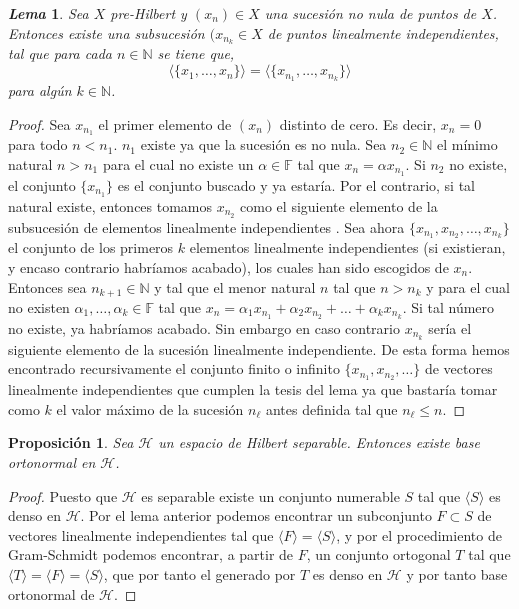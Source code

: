 \documentclass[12pt]{book}
\newtheorem{prop}{\bf Proposición}[chapter]
\newtheorem{lema}{\it Lema}[chapter]
\def\NN{\mathbb{N}}
\def\FF{\mathbb{F}}
\newcommand{\lin}[1]{\langle #1 \rangle}
\begin{document}
\begin{lema} Sea $X$ pre-Hilbert y $(x_n)\in X$ una sucesión no nula   de puntos de $X$. Entonces existe una subsucesión $(x_{n_k}\in X$    de puntos linealmente independientes, tal que para cada $n\in \NN$  se tiene  que,
$$\lin{\{x_1,\dots, x_n\}}=\lin{\{x_{n_1},\dots , x_{n_k}\}}$$ 
para algún $k\in \NN$.
\end{lema}
\begin{proof}
Sea $x_{n_1}$ el primer elemento de $(x_n)$ distinto de cero.  Es decir, $x_n=0$ para todo $n<n_1$. $n_1$ existe ya que la sucesión es no nula. Sea $n_2\in \NN$  el mínimo natural $n>n_1$    para el cual no existe un $\alpha\in \FF$ tal que $x_n=\alpha x_{n_1}$. Si $n_2$ no existe, el conjunto $\{x_{n_1}\}$  es el conjunto buscado y ya estaría. Por el contrario, si tal natural existe, entonces tomamos $x_{n_2}$ como el siguiente elemento de la subsucesión de elementos linealmente independientes . Sea ahora $\{x_{n_1},x_{n_2},\dots, x_{n_k}\}$ el conjunto de  los primeros $k$ elementos linealmente independientes  (si existieran, y encaso contrario habríamos acabado), los cuales han sido    escogidos de $x_n$. Entonces sea $n_{k+1}\in \NN$ y tal que el menor natural  $n$  tal que $n>n_k$ y para el cual no existen $\alpha_1,\dots,\alpha_k\in \FF$ tal que $x_n =\alpha_1 x_{n_1} +\alpha_2 x_{n_2}+\dots+\alpha_k x_{n_k}$.  Si tal número no existe, ya habríamos acabado. Sin embargo en caso contrario $x_{n_k}$ sería el siguiente elemento de la sucesión linealmente independiente. 
De esta forma hemos encontrado  recursivamente el conjunto finito o infinito $\{ x_{n_1}, x_{n_2},\dots\}$ de vectores linealmente independientes que cumplen  la tesis del lema ya que bastaría tomar como $k$ el valor máximo de la sucesión $n_\ell$ antes definida  tal que $n_\ell \leq n$.   
\end{proof}
\begin{prop} Sea $\mathcal{H}$ un espacio de Hilbert separable. Entonces existe   base ortonormal en $\mathcal{H}$.
\end{prop}
\begin{proof}
 Puesto que $\mathcal{H}$  es separable existe un conjunto numerable $S$ tal que  $\lin{S}$ es denso en $\mathcal{H}$. Por el lema anterior podemos encontrar un subconjunto $F\subset S$ de vectores linealmente independientes  tal que $\lin{F}=\lin{S}$, y por el procedimiento de Gram-Schmidt podemos encontrar, a partir de  $F$,  un conjunto ortogonal $T$ tal que $\lin{T}=\lin{F}=\lin{S}$, que por tanto el generado por $T$ es denso en $\mathcal{H}$ y por tanto base ortonormal de $\mathcal{H}$.
 \end{proof}
\end{document}
